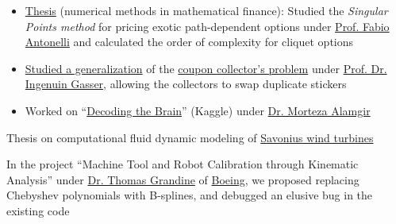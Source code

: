 \documentclass[10pt,a4paper]{resume}
\begin{document}
\begin{minipage}[t]{0.62\textwidth}
\divider

\begin{itemize}
	\item \href{https://www.dropbox.com/sh/zwi5gqo7b8un8g3/AADVbm9yp-VmX7zUB5bEivxja}{Thesis} (numerical methods in mathematical finance): Studied the \emph{Singular Points method} for pricing exotic path-dependent options under \href{http://www.disim.univaq.it/main/home.php?users_username=fabio.antonelli}{Prof. Fabio Antonelli} and calculated the order of complexity for cliquet options
	\item \href{https://www.dropbox.com/sh/5yhe31sjfpxppu5/AABD2ErSiQ-KNE3ITkjI9y8Na}{Studied a generalization} of the \href{https://en.wikipedia.org/wiki/Coupon_collector's_problem}{coupon collector’s problem} under \href{https://www.math.uni-hamburg.de/home/gasser}{Prof. Dr. Ingenuin Gasser}, allowing the collectors to swap duplicate stickers
	\item Worked on “\href{https://www.kaggle.com/c/decoding-the-human-brain}{Decoding the Brain}” (Kaggle) under \href{http://is.tuebingen.mpg.de/person/morteza}{Dr. Morteza Alamgir}
\end{itemize}

\divider

Thesis on computational fluid dynamic modeling of \href{https://en.wikipedia.org/wiki/Savonius_wind_turbine}{Savonius wind turbines}


In the project “Machine Tool and Robot Calibration through Kinematic Analysis” under \href{https://www.linkedin.com/in/thomas-grandine-75572570}{Dr. Thomas Grandine} of \href{http://www.boeing.com}{Boeing}, we proposed replacing Chebyshev polynomials with B-splines, and debugged an elusive bug in the existing code




\end{minipage}
\end{document}
